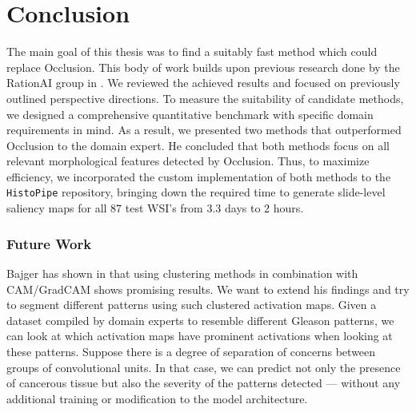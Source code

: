 \chapter*{Conclusion}

The main goal of this thesis was to find a suitably fast method which could replace Occlusion.
This body of work builds upon previous research done by the RationAI group in \cite{gallo, bajger-grad-cam, krajnansky-grad-cam, hruska-grad-cam}.
We reviewed the achieved results and focused on previously outlined perspective directions.
To measure the suitability of candidate methods, we designed a comprehensive quantitative benchmark with specific domain requirements in mind.
As a result, we presented two methods that outperformed Occlusion to the domain expert.
He concluded that both methods focus on all relevant morphological features detected by Occlusion.
Thus, to maximize efficiency, we incorporated the custom implementation of both methods to the \texttt{HistoPipe} repository, bringing down the required time to generate slide-level saliency maps for all $87$ test WSI's from $3.3$ days to $2$ hours.

\subsection*{Future Work}

Bajger has shown in \cite{bajger-grad-cam} that using clustering methods in combination with CAM/GradCAM shows promising results.
We want to extend his findings and try to segment different patterns using such clustered activation maps.
Given a dataset compiled by domain experts to resemble different Gleason patterns, we can look at which activation maps have prominent activations when looking at these patterns.
Suppose there is a degree of separation of concerns between groups of convolutional units. In that case, we can predict not only the presence of cancerous tissue but also the severity of the patterns detected --- without any additional training or modification to the model architecture.